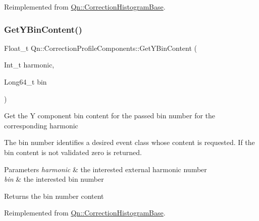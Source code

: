 Reimplemented from \mbox{\hyperlink{classQn_1_1CorrectionHistogramBase_af68a693d349023b08c412fea39b54dd9}{Qn\+::\+Correction\+Histogram\+Base}}.

\mbox{\label{classQn_1_1CorrectionProfileComponents_aba7aebf07e0a7add371da1d53101b64a}} 
\subsubsection{\texorpdfstring{Get\+Y\+Bin\+Content()}{GetYBinContent()}}
{\footnotesize\ttfamily Float\+\_\+t Qn\+::\+Correction\+Profile\+Components\+::\+Get\+Y\+Bin\+Content (\begin{DoxyParamCaption}\item[{Int\+\_\+t}]{harmonic,  }\item[{Long64\+\_\+t}]{bin }\end{DoxyParamCaption})\hspace{0.3cm}{\ttfamily [virtual]}}

Get the Y component bin content for the passed bin number for the corresponding harmonic

The bin number identifies a desired event class whose content is requested. If the bin content is not validated zero is returned.


\begin{DoxyParams}{Parameters}
{\em harmonic} & the interested external harmonic number \\
\hline
{\em bin} & the interested bin number \\
\hline
\end{DoxyParams}
\begin{DoxyReturn}{Returns}
the bin number content 
\end{DoxyReturn}


Reimplemented from \mbox{\hyperlink{classQn_1_1CorrectionHistogramBase_acc898b8b375f88d0625798d3b9a9b9ba}{Qn\+::\+Correction\+Histogram\+Base}}.

\mbox{\label{classQn_1_1CorrectionProfileComponents_a13d0f6f98ec1bf3fc5a3934c09d48ba9}} 
